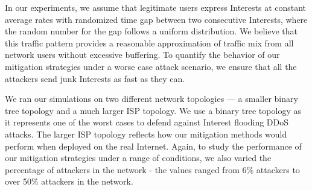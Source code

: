 
In our experiments, we assume that legitimate users express Interests at constant average rates with randomized time gap between two consecutive Interests, where the random number for the gap follows a uniform distribution. We believe that this traffic pattern provides a reasonable approximation of traffic mix from all network users without excessive buffering. To quantify the behavior of our mitigation strategies under a worse case attack scenario, we ensure that all the attackers send junk Interests as fast as they can. 



We ran our simulations on two different network topologies --- a smaller binary tree topology and a much larger ISP topology. We use a binary tree topology as it represents one of the worst cases to defend against Interest flooding DDoS attacks. The larger ISP topology reflects how our mitigation methods would perform when deployed on the real Internet.
Again, to study the performance of our mitigation strategies under a range of conditions, we also varied the percentage of attackers in the network - the values ranged from 6\% attackers to over 50\% attackers in the network.

